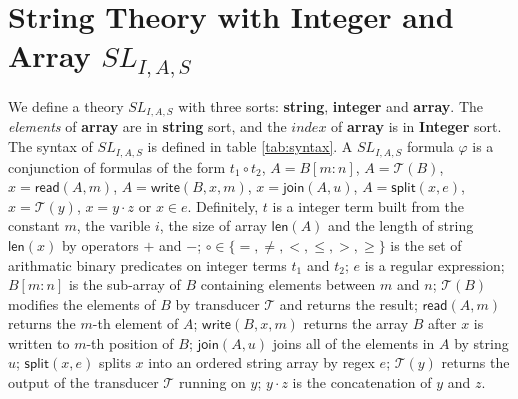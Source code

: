 \documentclass[12pt]{article}
\newcommand*{\transducer}{\mathcal{T}}
\newcommand{\mysplit}{\mathsf{split}}
\newcommand{\myjoin}{\mathsf{join}}
\newcommand{\mylen}{\mathsf{len}}
\newcommand{\myread}{\mathsf{read}}
\newcommand{\mywrite}{\mathsf{write}}
\newcommand{\arraylogic}{SL_{I,A,S}}
\theoremstyle{remark}
\begin{document}
\section{String Theory with Integer and Array $\arraylogic $}\label{sec:SL}
We define a theory $\arraylogic$ with three sorts: \textbf{string}, \textbf{integer} and \textbf{array}. The \textit{elements} of \textbf{array} are in \textbf{string} sort, and the $index$ of \textbf{array} is in \textbf{Integer} sort. The syntax of $\arraylogic$ is defined in table \ref{tab:syntax}. A $\arraylogic$ formula $\varphi$ is a conjunction of formulas of the form $t_1\circ t_2$, $A = B[m:n]$, $A = \transducer(B)$, $x = \myread(A,m)$, $A = \mywrite(B, x, m)$, $x=\myjoin(A,u)$, $A=\mysplit(x,e)$, $x = \transducer(y)$, $x=y\cdot z$ or $x\in e$. Definitely, $t$ is a integer term built from the constant $m$, the varible $i$, the size of array $\mylen(A)$ and the length of string $\mylen(x)$ by operators $+$ and $-$; $\circ \in \{=,\not=, <, \leq, >, \geq \}$ is the set of arithmatic binary predicates on integer terms $t_1$ and $t_2$; $e$ is a regular expression; $B[m:n]$ is the sub-array of $B$ containing elements between $m$ and $n$; $\transducer(B)$ modifies the elements of $B$ by transducer $\transducer$ and returns the result; $\myread(A, m)$ returns the $m$-th element of $A$; $\mywrite(B, x ,m)$ returns the array $B$ after $x$ is written to $m$-th position of $B$; $\myjoin(A,u)$ joins all of the elements in $A$ by string $u$; $\mysplit(x,e)$ splits $x$ into an ordered string array by regex $e$; $\transducer(y)$ returns the output of the transducer $\transducer$ running on $y$; $y\cdot z$ is the concatenation of $y$ and $z$.
\end{document}
